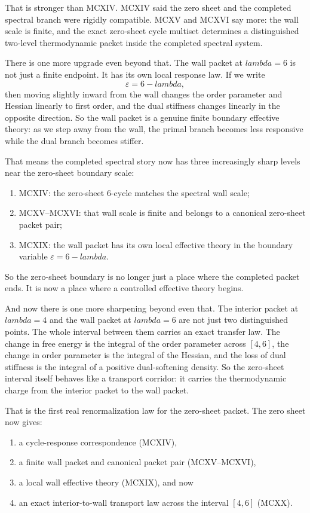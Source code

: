\documentclass[11pt]{article}
\def\lambda{lambda}%
\begin{document}
That is stronger than MCXIV. MCXIV said the zero sheet and the completed spectral branch were rigidly compatible. MCXV and MCXVI say more: the wall scale is finite, and the exact zero-sheet cycle multiset determines a distinguished two-level thermodynamic packet inside the completed spectral system.

There is one more upgrade even beyond that. The wall packet at $\lambda=6$ is not just a finite endpoint. It has its own local response law. If we write
\[
\varepsilon = 6-\lambda,
\]
then moving slightly inward from the wall changes the order parameter and Hessian linearly to first order, and the dual stiffness changes linearly in the opposite direction. So the wall packet is a genuine finite boundary effective theory: as we step away from the wall, the primal branch becomes less responsive while the dual branch becomes stiffer.

That means the completed spectral story now has three increasingly sharp levels near the zero-sheet boundary scale:
\begin{enumerate}
\item MCXIV: the zero-sheet $6$-cycle matches the spectral wall scale;
\item MCXV--MCXVI: that wall scale is finite and belongs to a canonical zero-sheet packet pair;
\item MCXIX: the wall packet has its own local effective theory in the boundary variable $\varepsilon=6-\lambda$.
\end{enumerate}
So the zero-sheet boundary is no longer just a place where the completed packet ends. It is now a place where a controlled effective theory begins.

And now there is one more sharpening beyond even that. The interior packet at $\lambda=4$ and the wall packet at $\lambda=6$ are not just two distinguished points. The whole interval between them carries an exact transfer law. The change in free energy is the integral of the order parameter across $[4,6]$, the change in order parameter is the integral of the Hessian, and the loss of dual stiffness is the integral of a positive dual-softening density. So the zero-sheet interval itself behaves like a transport corridor: it carries the thermodynamic charge from the interior packet to the wall packet.

That is the first real renormalization law for the zero-sheet packet. The zero sheet now gives:
\begin{enumerate}
\item a cycle-response correspondence (MCXIV),
\item a finite wall packet and canonical packet pair (MCXV--MCXVI),
\item a local wall effective theory (MCXIX), and now
\item an exact interior-to-wall transport law across the interval $[4,6]$ (MCXX).
\end{enumerate}
\end{document}

